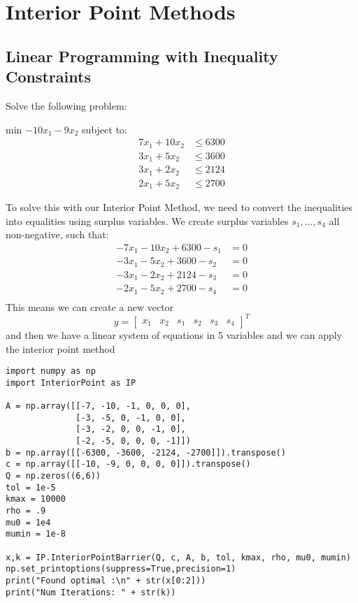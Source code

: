 \documentclass[11pt]{article}
\date{\today}
\title{}
\begin{document}
\tableofcontents

\section{Interior Point Methods}
\label{sec:org260d252}
\subsection{Linear Programming with Inequality Constraints}
\label{sec:orgbd73ef3}
Solve the following problem:

min \(-10x_1 - 9x_2\) subject to:
\begin{align*}
  7x_1 + 10x_2 &\leq 6300 \\
  3x_1 +  5x_2 &\leq 3600 \\
  3x_1 +  2x_2 &\leq 2124 \\
  2x_1 +  5x_2 &\leq 2700
\end{align*}

To solve this with our Interior Point Method, we need to convert the inequalities into equalities using surplus variables. We create surplus variables \(s_1,\ldots,s_4\) all non-negative, such that:
\begin{align*}
 -7x_1 - 10x_2 + 6300 - s_1 &= 0 \\
 -3x_1 - 5x_2  + 3600 - s_2 &= 0 \\
 -3x_1 - 2x_2  + 2124 - s_3 &= 0 \\
 -2x_1 - 5x_2  + 2700 - s_4 &= 0 \\
\end{align*}
This means we can create a new vector
\begin{equation*}
 y = \begin{bmatrix} x_1 & x_2 & s_1 & s_2 & s_3 & s_4 \end{bmatrix}^T
\end{equation*}
and then we have a linear system of equations in 5 variables and we can apply the interior point method

\begin{verbatim}
import numpy as np
import InteriorPoint as IP

A = np.array([[-7, -10, -1, 0, 0, 0],
              [-3, -5, 0, -1, 0, 0],
              [-3, -2, 0, 0, -1, 0],
              [-2, -5, 0, 0, 0, -1]])
b = np.array([[-6300, -3600, -2124, -2700]]).transpose()
c = np.array([[-10, -9, 0, 0, 0, 0]]).transpose()
Q = np.zeros((6,6))
tol = 1e-5
kmax = 10000
rho = .9
mu0 = 1e4
mumin = 1e-8

x,k = IP.InteriorPointBarrier(Q, c, A, b, tol, kmax, rho, mu0, mumin)
np.set_printoptions(suppress=True,precision=1)
print("Found optimal :\n" + str(x[0:2]))
print("Num Iterations: " + str(k))
\end{verbatim}
\end{document}
